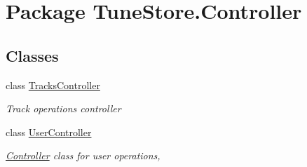 \hypertarget{namespace_tune_store_1_1_controller}{\section{Package Tune\+Store.\+Controller}
\label{namespace_tune_store_1_1_controller}
}
\subsection*{Classes}
\begin{DoxyCompactItemize}
\item 
class \hyperlink{class_tune_store_1_1_controller_1_1_tracks_controller}{Tracks\+Controller}
\begin{DoxyCompactList}\small\item\em Track operations controller \end{DoxyCompactList}\item 
class \hyperlink{class_tune_store_1_1_controller_1_1_user_controller}{User\+Controller}
\begin{DoxyCompactList}\small\item\em \hyperlink{namespace_tune_store_1_1_controller}{Controller} class for user operations, \end{DoxyCompactList}\end{DoxyCompactItemize}
